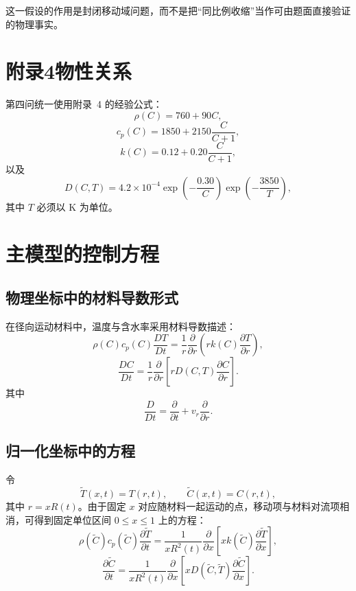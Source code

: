 \documentclass[UTF8,a4paper,12pt]{ctexart}
\begin{document}
这一假设的作用是封闭移动域问题，而不是把“同比例收缩”当作可由题面直接验证的物理事实。

\section{附录4物性关系}

第四问统一使用附录~4 的经验公式：
\begin{equation}
\rho(C)=760+90C,
\label{eq:rho4}
\end{equation}
\begin{equation}
c_p(C)=1850+2150\frac{C}{C+1},
\label{eq:cp4}
\end{equation}
\begin{equation}
k(C)=0.12+0.20\frac{C}{C+1},
\label{eq:k4}
\end{equation}
以及
\begin{equation}
D(C,T)
=
4.2\times10^{-4}
\exp\!\left(-\frac{0.30}{C}\right)
\exp\!\left(-\frac{3850}{T}\right),
\label{eq:D4}
\end{equation}
其中 $T$ 必须以 K 为单位。

\section{主模型的控制方程}

\subsection{物理坐标中的材料导数形式}

在径向运动材料中，温度与含水率采用材料导数描述：
\begin{equation}
\rho(C)c_p(C)\frac{DT}{Dt}
=
\frac{1}{r}\frac{\partial}{\partial r}
\left(
 r k(C)\frac{\partial T}{\partial r}
\right),
\label{eq:heat_phys}
\end{equation}
\begin{equation}
\frac{DC}{Dt}
=
\frac{1}{r}\frac{\partial}{\partial r}
\left[
 rD(C,T)\frac{\partial C}{\partial r}
\right].
\label{eq:moist_phys}
\end{equation}
其中
\[
\frac{D}{Dt}
=
\frac{\partial}{\partial t}
+v_r\frac{\partial}{\partial r}.
\]

\subsection{归一化坐标中的方程}

令
\[
\widetilde T(x,t)=T(r,t),\qquad
\widetilde C(x,t)=C(r,t),
\]
其中 $r=xR(t)$。由于固定 $x$ 对应随材料一起运动的点，移动项与材料对流项相消，可得到固定单位区间 $0\le x\le1$ 上的方程：
\begin{equation}
\rho(\widetilde C)c_p(\widetilde C)
\frac{\partial\widetilde T}{\partial t}
=
\frac{1}{xR^2(t)}
\frac{\partial}{\partial x}
\left[
 xk(\widetilde C)
 \frac{\partial\widetilde T}{\partial x}
\right],
\label{eq:heat_x}
\end{equation}
\begin{equation}
\frac{\partial\widetilde C}{\partial t}
=
\frac{1}{xR^2(t)}
\frac{\partial}{\partial x}
\left[
 xD(\widetilde C,\widetilde T)
 \frac{\partial\widetilde C}{\partial x}
\right].
\label{eq:moist_x}
\end{equation}
\end{document}
